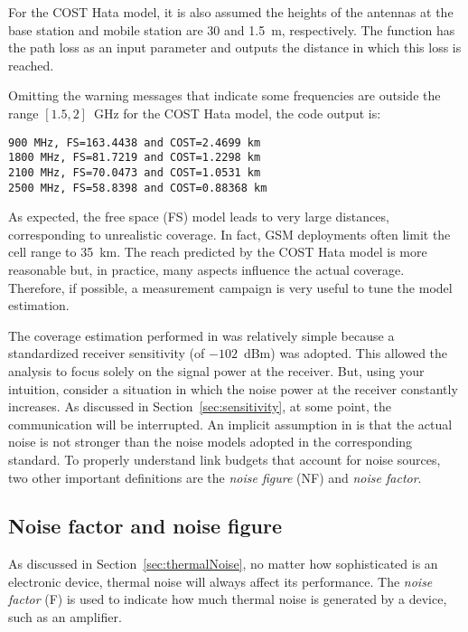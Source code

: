 For the COST Hata model, it is also assumed the heights of the antennas at the base station and mobile station are 30 and 1.5~m, respectively. The function  has the path loss
as an input parameter and outputs the distance in which this loss is reached.


Omitting the warning messages that indicate some frequencies are outside
the range $[1.5, 2]$~GHz for the COST Hata model, the code output is:
\begin{verbatim}
900 MHz, FS=163.4438 and COST=2.4699 km
1800 MHz, FS=81.7219 and COST=1.2298 km
2100 MHz, FS=70.0473 and COST=1.0531 km
2500 MHz, FS=58.8398 and COST=0.88368 km
\end{verbatim}
As expected, the free space (FS) model leads to very large distances, corresponding to unrealistic coverage. 
In fact, GSM deployments often limit the cell range to 35~km.
The reach predicted by the COST Hata model is more reasonable but, in practice, many
aspects influence the actual coverage. Therefore, if possible, a measurement campaign is very
useful to tune the model estimation.
\eExample

The coverage estimation performed in  was relatively simple because
a standardized receiver sensitivity (of $-102$~dBm) was adopted. This allowed the analysis
to focus solely on the signal power at the receiver. But, using your intuition, consider
a situation in which the noise power at the receiver constantly increases. 
As discussed in Section~\ref{sec:sensitivity}, at some point,
the communication will be interrupted. An implicit assumption in
 is that the actual 
noise is not stronger than the noise models adopted in
the corresponding standard. To properly understand link budgets that account for noise sources,
two other important definitions are the \emph{noise figure} (NF) and \emph{noise factor}.

\subsection{Noise factor and noise figure}
\label{sec:noiseFactor}

As discussed in Section~\ref{sec:thermalNoise}, no matter how sophisticated is an electronic device, thermal noise will always affect its performance. 
The \emph{noise factor} (F) is used to indicate how much thermal noise is generated by a device, such as an amplifier. 


